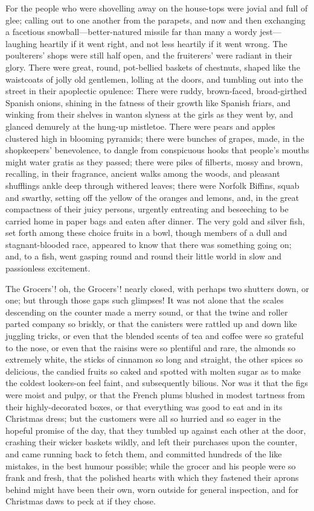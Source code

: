 \documentclass[paper=a5,BCOR=15mm,twoside,DIV=15,headinclude=off,12pt,chapterprefix=off,openany,headings=huge]{scrbook} %
\begin{document}
For the people who were shovelling away on the house-tops were jovial and full of glee; calling out to one another from the parapets, and now and then exchanging a facetious snowball—better-natured missile far than many a wordy jest—laughing heartily if it went right, and not less heartily if it went wrong. The poulterers' shops were still half open, and the fruiterers' were radiant in their glory. There were great, round, pot-bellied baskets of chestnuts, shaped like the waistcoats of jolly old gentlemen, lolling at the doors, and tumbling out into the street in their apoplectic opulence: There were ruddy, brown-faced, broad-girthed Spanish onions, shining in the fatness of their growth like Spanish friars, and winking from their shelves in wanton slyness at the girls as they went by, and glanced demurely at the hung-up mistletoe. There were pears and apples clustered high in blooming pyramids; there were bunches of grapes, made, in the shopkeepers' benevolence, to dangle from conspicuous hooks that people's mouths might water gratis as they passed; there were piles of filberts, mossy and brown, recalling, in their fragrance, ancient walks among the woods, and pleasant shufflings ankle deep through withered leaves; there were Norfolk Biffins, squab and swarthy, setting off the yellow of the oranges and lemons, and, in the great compactness of their juicy persons, urgently entreating and beseeching to be carried home in paper bags and eaten after dinner. The very gold and silver fish, set forth among these choice fruits in a bowl, though members of a dull and stagnant-blooded race, appeared to know that there was something going on; and, to a fish, went gasping round and round their little world in slow and passionless excitement.

The Grocers'! oh, the Grocers'! nearly closed, with perhaps two shutters down, or one; but through those gaps such glimpses! It was not alone that the scales descending on the counter made a merry sound, or that the twine and roller parted company so briskly, or that the canisters were rattled up and down like juggling tricks, or even that the blended scents of tea and coffee were so grateful to the nose, or even that the raisins were so plentiful and rare, the almonds so extremely white, the sticks of cinnamon so long and straight, the other spices so delicious, the candied fruits so caked and spotted with molten sugar as to make the coldest lookers-on feel faint, and subsequently bilious. Nor was it that the figs were moist and pulpy, or that the French plums blushed in modest tartness from their highly-decorated boxes, or that everything was good to eat and in its Christmas dress; but the customers were all so hurried and so eager in the hopeful promise of the day, that they tumbled up against each other at the door, crashing their wicker baskets wildly, and left their purchases upon the counter, and came running back to fetch them, and committed hundreds of the like mistakes, in the best humour possible; while the grocer and his people were so frank and fresh, that the polished hearts with which they fastened their aprons behind might have been their own, worn outside for general inspection, and for Christmas daws to peck at if they chose.
\end{document}
